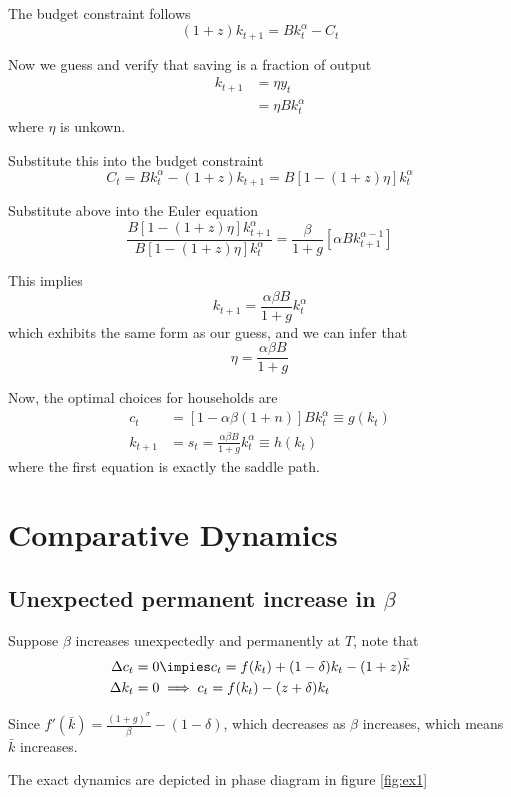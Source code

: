 \documentclass[twocolumn, fleqn]{article}
\begin{document}
			The budget constraint follows
			\[(1+z)k_{t+1} = Bk_t^\alpha -C_t\]

			Now we guess and verify that saving is a fraction of output
			\begin{align*}
				k_{t+1} &= \eta y_t \\
				&= \eta B k_t^{\alpha}
			\end{align*}
			where $\eta$ is unkown.

			Substitute this into the budget constraint
			\[C_t = Bk_t^\alpha - (1+z)k_{t+1}= B[1-(1+z)\eta]k_t^\alpha\]

			Substitute above into the Euler equation
			\[\frac{B[1-(1+z)\eta]k_{t+1}^\alpha}{B[1-(1+z)\eta]k_{t}^\alpha}= \frac{\beta}{1+g}[\alpha B k_{t+1}^{\alpha -1}]\]

			This implies
			\[k_{t+1}= \frac{\alpha \beta B}{1+g}k_t^\alpha\]
			which exhibits the same form as our guess, and we can infer that
			\[\eta = \frac{\alpha \beta B}{1+g}\]

			Now, the optimal choices for households are
			\begin{align*}
				c_t &= [1-\alpha \beta(1+n)]Bk_t^{\alpha} \equiv g(k_t)\\
				k_{t+1} &= s_t = \frac{\alpha \beta B}{1+g}k_t^\alpha \equiv h(k_t)
			\end{align*}
			where the first equation is exactly the saddle path.


	\section{Comparative Dynamics}\label{sec:comparative-dynamics}
		\subsection{Unexpected permanent increase in $\beta$}\label{subsec:unexpected}
			Suppose $\beta$ increases unexpectedly and permanently at $T$, note that
			\begin{align*}
				\Delta c_t &= 0 \impies c_t = f(k_t) + (1-\delta)k_t - (1+z)\bar{k}\\
				\Delta k_t &= 0 \implies c_t = f(k_t) - (z+\delta)k_t
			\end{align*}

			Since $f'(\bar k)=\frac{(1+g)^\sigma}{\beta} - (1-\delta)$, which decreases as $\beta$ increases, which
			means $\bar k$ increases.

			The exact dynamics are depicted in phase diagram in figure \eqref{fig:ex1}
\end{document}
